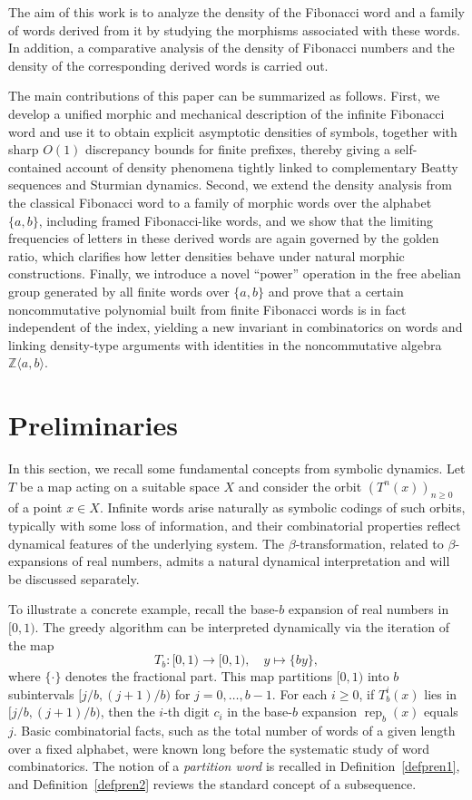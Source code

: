 \documentclass[12pt, a4paper]{article}
\begin{document}
The aim of this work is to analyze the density of the Fibonacci word and a family of words derived from it by studying the morphisms associated with these words. In addition, a comparative analysis of the density of Fibonacci numbers and the density of the corresponding derived words is carried out.

The main contributions of this paper can be summarized as follows. 
First, we develop a unified morphic and mechanical description of the infinite Fibonacci word and use it to obtain explicit asymptotic densities of symbols, together with sharp $O(1)$ discrepancy bounds for finite prefixes, thereby giving a self-contained account of density phenomena tightly linked to complementary Beatty sequences and Sturmian dynamics. 
Second, we extend the density analysis from the classical Fibonacci word to a family of morphic words over the alphabet $\{a,b\}$, including framed Fibonacci-like words, and we show that the limiting frequencies of letters in these derived words are again governed by the golden ratio, which clarifies how letter densities behave under natural morphic constructions. 
Finally, we introduce a novel ``power'' operation in the free abelian group generated by all finite words over $\{a,b\}$ and prove that a certain noncommutative polynomial built from finite Fibonacci words is in fact independent of the index, yielding a new invariant in combinatorics on words and linking density-type arguments with identities in the noncommutative algebra $\mathbb{Z}\langle a,b\rangle$.
\section{Preliminaries}\label{sec2}
In this section, we recall some fundamental concepts from symbolic dynamics. Let $T$ be a map acting on a suitable space $X$ and consider the orbit $(T^n(x))_{n \ge 0}$ of a point $x \in X$. Infinite words arise naturally as symbolic codings of such orbits, typically with some loss of information, and their combinatorial properties reflect dynamical features of the underlying system. The $\beta$-transformation, related to $\beta$-expansions of real numbers, admits a natural dynamical interpretation and will be discussed separately.

To illustrate a concrete example, recall the base-$b$ expansion of real numbers in $[0,1)$. The greedy algorithm can be interpreted dynamically via the iteration of the map
\[
T_b : [0,1) \to [0,1), \quad y \mapsto \{by\},
\]
where $\{\cdot\}$ denotes the fractional part. This map partitions $[0,1)$ into $b$ subintervals $[j/b,(j+1)/b)$ for $j = 0,\dots,b-1$. For each $i \ge 0$, if $T_b^i(x)$ lies in $[j/b,(j+1)/b)$, then the $i$-th digit $c_i$ in the base-$b$ expansion $\operatorname{rep}_b(x)$ equals $j$. Basic combinatorial facts, such as the total number of words of a given length over a fixed alphabet, were known long before the systematic study of word combinatorics. The notion of a \emph{partition word} is recalled in Definition~\ref{defpren1}, and Definition~\ref{defpren2} reviews the standard concept of a subsequence.
\end{document}
